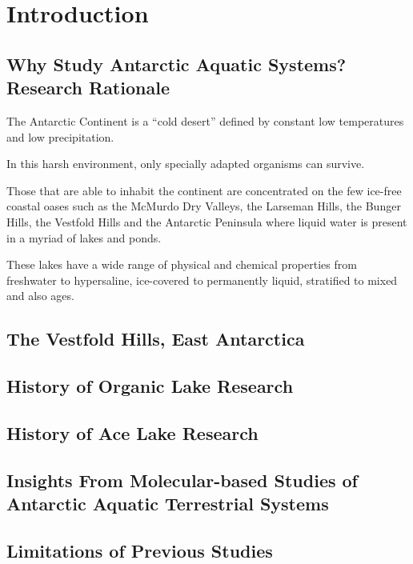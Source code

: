 \section{Introduction}

\subsection{Why Study Antarctic Aquatic Systems? Research Rationale}

The Antarctic Continent is a ``cold desert'' defined by constant
low temperatures and low precipitation.

In this harsh environment, only specially adapted organisms can
survive.

Those that are able to inhabit the continent are concentrated on
the few ice-free coastal oases such as the McMurdo Dry Valleys, the
Larseman Hills, the Bunger Hills, the Vestfold Hills and the
Antarctic Peninsula where liquid water is present in a myriad of
lakes and ponds.

These lakes have a wide range of physical and chemical properties
from freshwater to hypersaline, ice-covered to permanently liquid,
stratified to mixed and also ages.

\subsection{The Vestfold Hills, East Antarctica}

\subsection{History of Organic Lake Research}

\subsection{History of Ace Lake Research}

\subsection{Insights From Molecular-based Studies of Antarctic Aquatic Terrestrial Systems}

\subsection{Limitations of Previous Studies}

